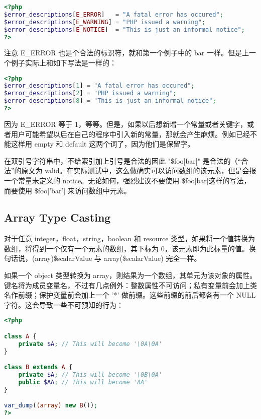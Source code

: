 \begin{lstlisting}[language=PHP]
<?php
$error_descriptions[E_ERROR]   = "A fatal error has occured";
$error_descriptions[E_WARNING] = "PHP issued a warning";
$error_descriptions[E_NOTICE]  = "This is just an informal notice";
?>
\end{lstlisting}

注意 E\_ERROR 也是个合法的标识符，就和第一个例子中的 bar 一样。但是上一个例子实际上和如下写法是一样的：



\begin{lstlisting}[language=PHP]
<?php
$error_descriptions[1] = "A fatal error has occured";
$error_descriptions[2] = "PHP issued a warning";
$error_descriptions[8] = "This is just an informal notice";
?>
\end{lstlisting}

因为 E\_ERROR 等于 1，等等。但是，如果以后想新增一个常量或者关键字，或者用户可能希望以后在自己的程序中引入新的常量，那就会产生麻烦。例如已经不能这样用 empty 和 default 这两个词了，因为他们是保留字。

在双引号字符串中，不给索引加上引号是合法的因此 "\$foo[bar]" 是合法的（“合法”的原文为 valid。在实际测试中，这么做确实可以访问数组的该元素，但是会报一个常量未定义的 notice。无论如何，强烈建议不要使用 \$foo[bar]这样的写法，而要使用 \$foo['bar'] 来访问数组中元素。


\subsection{Array Type Casting}

对于任意 integer，float，string，boolean 和 resource 类型，如果将一个值转换为数组，将得到一个仅有一个元素的数组，其下标为 0，该元素即为此标量的值。换句话说，(array)\$scalarValue 与 array(\$scalarValue) 完全一样。

如果一个 object 类型转换为 array，则结果为一个数组，其单元为该对象的属性。键名将为成员变量名，不过有几点例外：整数属性不可访问；私有变量前会加上类名作前缀；保护变量前会加上一个 '*' 做前缀。这些前缀的前后都各有一个 NULL 字符。这会导致一些不可预知的行为：







\begin{lstlisting}[language=PHP]
<?php

class A {
    private $A; // This will become '\0A\0A'
}

class B extends A {
    private $A; // This will become '\0B\0A'
    public $AA; // This will become 'AA'
}

var_dump((array) new B());
?>
\end{lstlisting}

